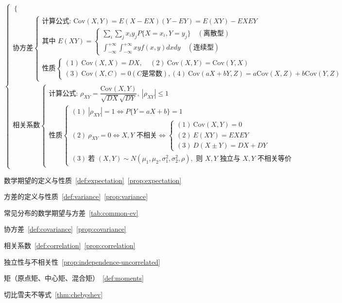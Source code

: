 \documentclass[lang=cn,11pt]{elegantbook}
\begin{document}
\[\begin{cases}
\begin{cases}
\end{cases} \\
\text{协方差}
\begin{cases}
\text{计算公式: } \text{Cov}(X,Y)=E(X-EX)(Y-EY)=E(XY)-EXEY \\
\text{其中 } E(XY)=
\begin{cases}
\sum\limits_{i}\sum\limits_{j} x_i y_j P\{X=x_i,Y=y_j\} \quad (\text{离散型}) \\
\int_{-\infty}^{+\infty}\int_{-\infty}^{+\infty} xy f(x,y) dxdy \quad (\text{连续型})
\end{cases} \\
\text{性质}
\begin{cases}
(1)\ \text{Cov}(X,X)=DX ,~~~~~(2)\ \text{Cov}(X,Y)=\text{Cov}(Y,X) \\
(3)\ \text{Cov}(X,C)=0 (C \text{是常数}) ,(4)\ \text{Cov}(aX+bY,Z)=a\text{Cov}(X,Z)+b\text{Cov}(Y,Z)
\end{cases}
\end{cases} \\
\text{相关系数}
\begin{cases}
\text{计算公式: } \rho_{XY}=\dfrac{\text{Cov}(X,Y)}{\sqrt{DX}\sqrt{DY}},\ |\rho_{XY}|\leqslant1 \\
\text{性质}
\begin{cases}
(1)\ |\rho_{XY}|=1 \Leftrightarrow P\{Y=aX+b\}=1 \\
(2)\ \rho_{XY}=0 \Leftrightarrow X,Y \text{ 不相关} \Leftrightarrow
\begin{cases}
(1)\ \text{Cov}(X,Y)=0 \\
(2)\ E(XY)=EXEY \\
(3)\ D(X\pm Y)=DX+DY
\end{cases} \\
(3)\ \text{若 } (X,Y)\sim N(\mu_1,\mu_2,\sigma_1^2,\sigma_2^2,\rho), \text{ 则 } X,Y \text{ 独立与 } X,Y \text{ 不相关等价}
\end{cases}
\end{cases}
\end{cases}
\]

\begin{introduction}
    \item 数学期望的定义与性质~\ref{def:expectation}~\ref{prop:expectation}
    \item 方差的定义与性质~\ref{def:variance}~\ref{prop:variance}
    \item 常见分布的数学期望与方差~\ref{tab:common-ev}
    \item 协方差~\ref{def:covariance}~\ref{prop:covariance}
    \item 相关系数~\ref{def:correlation}~\ref{prop:correlation}
    \item 独立性与不相关性~\ref{prop:independence-uncorrelated}
    \item 矩（原点矩、中心矩、混合矩）~\ref{def:moments}
    \item 切比雪夫不等式~\ref{thm:chebyshev}
\end{introduction}
\end{document}
